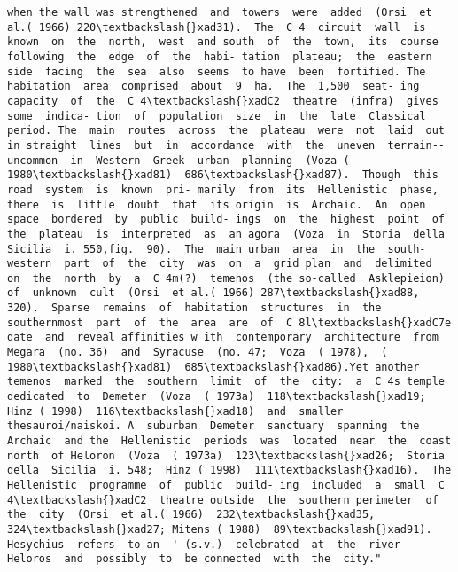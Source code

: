 \documentclass[11pt]{article}
\begin{document}
\begin{Verbatim}[commandchars=\\\{\}]
when the wall was strengthened  and  towers  were  added  (Orsi  et al.( 1966) 220\textbackslash{}xad31).  The  C 4  circuit  wall  is  known  on  the  north,  west  and south  of  the  town,  its  course  following  the  edge  of  the  habi- tation  plateau;  the  eastern  side  facing  the  sea  also  seems  to have  been  fortified. The  habitation  area  comprised  about  9  ha.  The  1,500  seat- ing  capacity  of  the  C 4\textbackslash{}xadC2  theatre  (infra)  gives  some  indica- tion  of  population  size  in  the  late  Classical  period. The  main  routes  across  the  plateau  were  not  laid  out  in straight  lines  but  in  accordance  with  the  uneven  terrain-- uncommon  in  Western  Greek  urban  planning  (Voza ( 1980\textbackslash{}xad81)  686\textbackslash{}xad87).  Though  this  road  system  is  known  pri- marily  from  its  Hellenistic  phase,  there  is  little  doubt  that  its origin  is  Archaic.  An  open  space  bordered  by  public  build- ings  on  the  highest  point  of  the  plateau  is  interpreted  as  an agora  (Voza  in  Storia  della  Sicilia  i. 550,fig.  90).  The  main urban  area  in  the  south-western  part  of  the  city  was  on  a  grid plan  and  delimited  on  the  north  by  a  C 4m(?)  temenos  (the so-called  Asklepieion)  of  unknown  cult  (Orsi  et al.( 1966) 287\textbackslash{}xad88,  320).  Sparse  remains  of  habitation  structures  in  the southernmost  part  of  the  area  are  of  C 8l\textbackslash{}xadC7e  date  and  reveal affinities w ith  contemporary  architecture  from  Megara  (no. 36)  and  Syracuse  (no. 47;  Voza  ( 1978),  ( 1980\textbackslash{}xad81)  685\textbackslash{}xad86).Yet another  temenos  marked  the  southern  limit  of  the  city:  a  C 4s temple  dedicated  to  Demeter  (Voza  ( 1973a)  118\textbackslash{}xad19;  Hinz ( 1998)  116\textbackslash{}xad18)  and  smaller  thesauroi/naiskoi. A  suburban  Demeter  sanctuary  spanning  the  Archaic  and the  Hellenistic  periods  was  located  near  the  coast  north  of Heloron  (Voza  ( 1973a)  123\textbackslash{}xad26;  Storia  della  Sicilia  i. 548;  Hinz ( 1998)  111\textbackslash{}xad16).  The  Hellenistic  programme  of  public  build- ing  included  a  small  C 4\textbackslash{}xadC2  theatre outside  the  southern perimeter  of  the  city  (Orsi  et al.( 1966)  232\textbackslash{}xad35,  324\textbackslash{}xad27; Mitens ( 1988)  89\textbackslash{}xad91).  Hesychius  refers  to an  ' (s.v.)  celebrated  at  the  river  Heloros  and  possibly  to  be connected  with  the  city."
\end{Verbatim}
        
\end{document}
